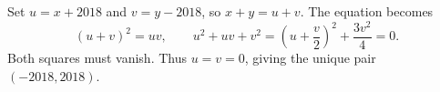 Set $u=x+2018$ and $v=y-2018$, so $x+y=u+v$. The equation becomes
\[
(u+v)^2=uv,\qquad
u^2+uv+v^2=\left(u+\dfrac{v}{2}\right)^2+\dfrac{3v^2}{4}=0.
\]
Both squares must vanish. Thus $u=v=0$, giving the unique pair $\boxed{(-2018,2018)}$.
